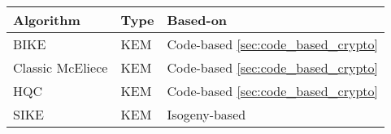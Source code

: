 \begin{tabular}{|l|l|l|}
  \hline
  Algorithm        & Type & Based-on                               \\
  \hline
  BIKE             & KEM  & Code-based \ref{sec:code_based_crypto} \\
  Classic McEliece & KEM  & Code-based \ref{sec:code_based_crypto} \\
  HQC              & KEM  & Code-based \ref{sec:code_based_crypto} \\
  SIKE             & KEM  & Isogeny-based                          \\
  \hline
\end{tabular}
